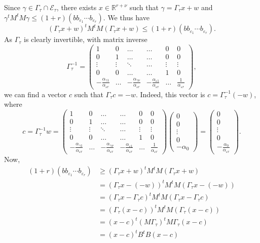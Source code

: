 Since $\gamma\in \Gamma_\tau\cap \mathcal E_\tau$, there exists $x\in \mathbb{R}^{r + \nu}$ such that $\gamma=\Gamma_\tau x+w$ and ${\gamma^tM^tM\gamma\leq (1 + r)(bb_{\varepsilon_1}\cdots b_{\varepsilon_r})}$. We thus have
\[(\Gamma_\tau x+w)^tM^tM(\Gamma_\tau x+w) \leq (1 + r)(bb_{\varepsilon_1}\cdots b_{\varepsilon_r}).\]
As $\Gamma_{\tau}$ is clearly invertible, with matrix inverse
\[\Gamma_{\tau}^{-1} = \begin{pmatrix}
	1 & 0 & \dots &  \dots & 0 & 0\\ 
	0 & 1	& \dots & \dots & 0 & 0\\
	\vdots & \vdots & \ddots & \dots & \vdots & \vdots \\ 
	0 & 0 & \dots &  \dots & 1 & 0\\ 
	-\frac{\alpha_{\gamma 1}}{\alpha_{\varepsilon {r}}} & \dots &-\frac{\alpha_{\gamma {\nu}}}{\alpha_{\varepsilon {r}}} & -\frac{\alpha_{\varepsilon 1}}{\alpha_{\varepsilon {r}}} & \dots & \frac{1}{\alpha_{\varepsilon {r}}}
\end{pmatrix},\]
we can find a vector $c$ such that $\Gamma_{\tau}c = -w$. Indeed, this vector is $c = \Gamma_{\tau}^{-1}(-w)$, where
\[c = \Gamma_{\tau}^{-1}w = \begin{pmatrix}
	1 & 0 & \dots &  \dots & 0 & 0\\ 
	0 & 1	& \dots & \dots & 0 & 0\\
	\vdots & \vdots & \ddots & \dots & \vdots & \vdots \\ 
	0 & 0 & \dots &  \dots & 1 & 0\\ 
	-\frac{\alpha_{\gamma 1}}{\alpha_{\varepsilon {r}}} & \dots &-\frac{\alpha_{\gamma {\nu}}}{\alpha_{\varepsilon {r}}} & -\frac{\alpha_{\varepsilon 1}}{\alpha_{\varepsilon r}} & \dots & \frac{1}{\alpha_{\varepsilon {r}}}
\end{pmatrix}
	\begin{pmatrix}
	0 \\ 0 \\ \vdots \\ 0 \\ -\alpha_0
	\end{pmatrix}
	= \begin{pmatrix}
	0 \\ 0 \\ \vdots \\ 0 \\ -\frac{\alpha_0}{\alpha_{\varepsilon r}}
\end{pmatrix}.\]
Now, 
\begin{align*}
(1 + r)(bb_{\varepsilon_1}\cdots b_{\varepsilon_r})
	& \geq (\Gamma_\tau x+w)^tM^tM(\Gamma_\tau x+w) \\
	& =  (\Gamma_\tau x- (-w))^tM^tM(\Gamma_\tau x-(-w)) \\
	& = (\Gamma_\tau x-\Gamma_{\tau}c)^tM^tM(\Gamma_\tau x-\Gamma_{\tau}c)\\
	& = (\Gamma_\tau (x-c))^tM^tM(\Gamma_\tau (x-c))\\
	& = (x-c)^t(M\Gamma_{\tau})^tM\Gamma_\tau(x-c)\\
	& = (x-c)^tB^tB(x-c)
\end{align*}
